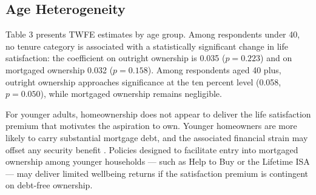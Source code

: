 \documentclass[12pt,a4paper]{article}
\begin{document}
 
\subsection{Age Heterogeneity}
 
Table 3 presents TWFE estimates by age group. Among respondents under 40,
no tenure category is associated with a statistically significant change in
life satisfaction: the coefficient on outright ownership is 0.035
($p = 0.223$) and on mortgaged ownership 0.032 ($p = 0.158$). Among
respondents aged 40 plus, outright ownership approaches significance at
the ten percent level (0.058, $p = 0.050$), while mortgaged ownership
remains negligible.
 
For younger adults, homeownership does not appear to deliver the life
satisfaction premium that motivates the aspiration to own. Younger
homeowners are more likely to carry substantial mortgage debt, and the
associated financial strain may offset any security benefit \citep{ViforJ2024}.
Policies designed to facilitate entry into mortgaged ownership among
younger households --- such as Help to Buy or the Lifetime ISA --- may deliver limited wellbeing returns if the satisfaction premium
is contingent on debt-free ownership.


 

 
 
\end{document}
